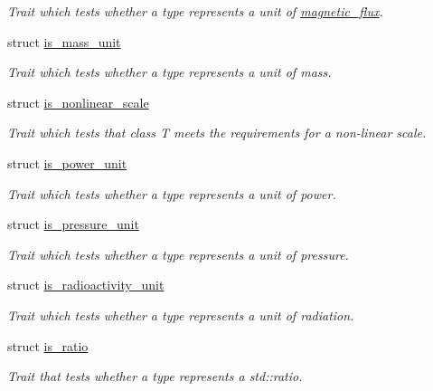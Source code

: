 \begin{DoxyCompactItemize}
\begin{DoxyCompactList}\small\item\em Trait which tests whether a type represents a unit of \hyperlink{namespaceunits_1_1magnetic__flux}{magnetic\+\_\+flux}. \end{DoxyCompactList}\item 
struct \hyperlink{structunits_1_1traits_1_1is__mass__unit}{is\+\_\+mass\+\_\+unit}
\begin{DoxyCompactList}\small\item\em Trait which tests whether a type represents a unit of mass. \end{DoxyCompactList}\item 
struct \hyperlink{structunits_1_1traits_1_1is__nonlinear__scale}{is\+\_\+nonlinear\+\_\+scale}
\begin{DoxyCompactList}\small\item\em Trait which tests that {\ttfamily class T} meets the requirements for a non-\/linear scale. \end{DoxyCompactList}\item 
struct \hyperlink{structunits_1_1traits_1_1is__power__unit}{is\+\_\+power\+\_\+unit}
\begin{DoxyCompactList}\small\item\em Trait which tests whether a type represents a unit of power. \end{DoxyCompactList}\item 
struct \hyperlink{structunits_1_1traits_1_1is__pressure__unit}{is\+\_\+pressure\+\_\+unit}
\begin{DoxyCompactList}\small\item\em Trait which tests whether a type represents a unit of pressure. \end{DoxyCompactList}\item 
struct \hyperlink{structunits_1_1traits_1_1is__radioactivity__unit}{is\+\_\+radioactivity\+\_\+unit}
\begin{DoxyCompactList}\small\item\em Trait which tests whether a type represents a unit of radiation. \end{DoxyCompactList}\item 
struct \hyperlink{structunits_1_1traits_1_1is__ratio}{is\+\_\+ratio}
\begin{DoxyCompactList}\small\item\em Trait that tests whether a type represents a std\+::ratio. \end{DoxyCompactList}\item 

\end{DoxyCompactItemize}
